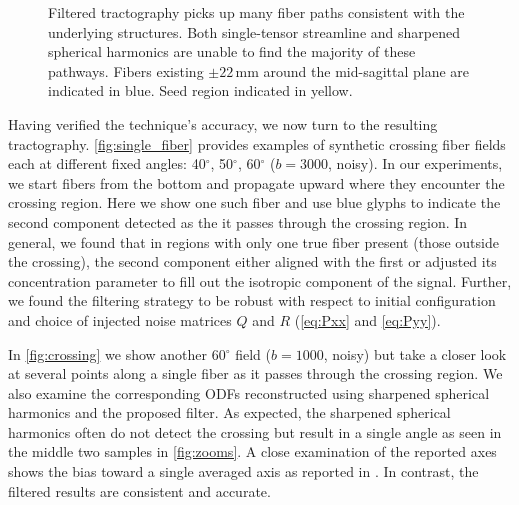 \documentclass[letterpaper,hyperref,12pt]{gatech-thesis}
\renewcommand{\deg}{\ensuremath{^\circ}\xspace}
\newcommand{\bn}[1]{\ensuremath{b\!=\!#1}\xspace}
\newcommand{\bone}{\bn{1000}}
\newcommand{\bthree}{\bn{3000}}
\begin{document}
\begin{figure*}[t]
  \centering

  \caption{Filtered tractography picks up many fiber paths consistent with the
    underlying structures.  Both single-tensor streamline and sharpened
    spherical harmonics are unable to find the majority of these pathways.
    Fibers existing $\pm22\,\text{mm}$ around the mid-sagittal plane are
    indicated in blue.  Seed region indicated in yellow.}
  \label{fig:tc}
\end{figure*}
Having verified the technique's accuracy, we now turn to the resulting
tractography.  \autoref{fig:single_fiber} provides examples of synthetic
crossing fiber fields each at different fixed angles: 40\deg, 50\deg, 60\deg
(\bthree, noisy).  In our experiments, we start fibers from the bottom and
propagate upward where they encounter the crossing region.  Here we show one
such fiber and use blue glyphs to indicate the second component detected as
the it passes through the crossing region.  In general, we found that in
regions with only one true fiber present (those outside the crossing), the
second component either aligned with the first or adjusted its concentration
parameter to fill out the isotropic component of the signal.  Further, we
found the filtering strategy to be robust with respect to initial
configuration and choice of injected noise matrices $Q$ and $R$
(\autoref{eq:Pxx} and \autoref{eq:Pyy}).

In \autoref{fig:crossing} we show another 60\deg field (\bone, noisy) but take
a closer look at several points along a single fiber as it passes through the
crossing region.  We also examine the corresponding ODFs reconstructed using
sharpened spherical harmonics and the proposed filter.  As expected, the
sharpened spherical harmonics often do not detect the crossing but result in a
single angle as seen in the middle two samples in \autoref{fig:zooms}.  A
close examination of the reported axes shows the bias toward a single averaged
axis as reported in \cite{Zhan2006,Tournier2007,Schultz2008}.  In contrast,
the filtered results are consistent and accurate.
\end{document}
